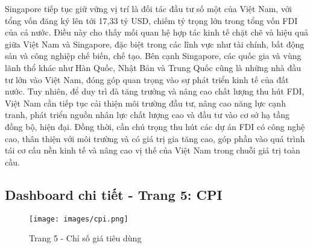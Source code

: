 \documentclass[a4paper]{report}
\begin{document}
{{Singapore tiếp tục giữ vững vị trí là đối tác đầu tư số một của Việt Nam, với tổng vốn đăng ký lên tới 17,33 tỷ USD, chiếm tỷ trọng lớn trong tổng vốn FDI của cả nước. Điều này cho thấy mối quan hệ hợp tác kinh tế chặt chẽ và hiệu quả giữa Việt Nam và Singapore, đặc biệt trong các lĩnh vực như tài chính, bất động sản và công nghiệp chế biến, chế tạo. Bên cạnh Singapore, các quốc gia và vùng lãnh thổ khác như Hàn Quốc, Nhật Bản và Trung Quốc cũng là những nhà đầu tư lớn vào Việt Nam, đóng góp quan trọng vào sự phát triển kinh tế của đất nước. Tuy nhiên, để duy trì đà tăng trưởng và nâng cao chất lượng thu hút FDI, Việt Nam cần tiếp tục cải thiện môi trường đầu tư, nâng cao năng lực cạnh tranh, phát triển nguồn nhân lực chất lượng cao và đầu tư vào cơ sở hạ tầng đồng bộ, hiện đại. Đồng thời, cần chú trọng thu hút các dự án FDI có công nghệ cao, thân thiện với môi trường và có giá trị gia tăng cao, góp phần vào quá trình tái cơ cấu nền kinh tế và nâng cao vị thế của Việt Nam trong chuỗi giá trị toàn cầu.

\newpage
\subsection{Dashboard chi tiết - Trang 5: CPI}

\begin{figure}[H]
    \centering
    \texttt{[image: images/cpi.png]}
    \caption{Trang 5 - Chỉ số giá tiêu dùng}
    \label{fig:enter-label}
\end{figure}

}}
\end{document}

